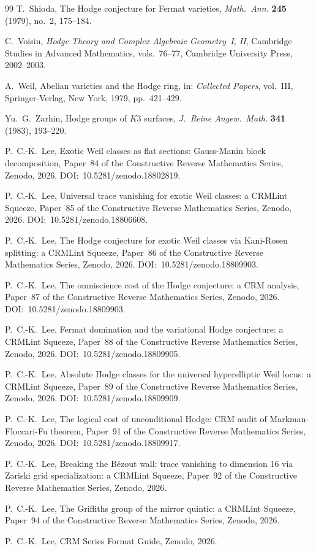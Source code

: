 \documentclass[11pt]{article}
\theoremstyle{plain}
\theoremstyle{definition}
\theoremstyle{remark}
\begin{document}
\begin{thebibliography}{99}
T.~Shioda,
The Hodge conjecture for Fermat varieties,
\emph{Math.\ Ann.} \textbf{245} (1979), no.~2, 175--184.

C.~Voisin,
\emph{Hodge Theory and Complex Algebraic Geometry~I, II},
Cambridge Studies in Advanced Mathematics, vols.~76--77,
Cambridge University Press, 2002--2003.

A.~Weil,
Abelian varieties and the Hodge ring,
in: \emph{Collected Papers}, vol.~III,
Springer-Verlag, New York, 1979, pp.~421--429.

Yu.~G.~Zarhin,
Hodge groups of $K3$ surfaces,
\emph{J.~Reine Angew.\ Math.} \textbf{341} (1983), 193--220.


P.~C.-K.~Lee,
Exotic Weil classes as flat sections: Gauss-Manin block decomposition,
Paper~84 of the Constructive Reverse Mathematics Series,
Zenodo, 2026.
DOI:~10.5281/zenodo.18802819.

P.~C.-K.~Lee,
Universal trace vanishing for exotic Weil classes: a CRMLint Squeeze,
Paper~85 of the Constructive Reverse Mathematics Series,
Zenodo, 2026.
DOI:~10.5281/zenodo.18806608.

P.~C.-K.~Lee,
The Hodge conjecture for exotic Weil classes via Kani-Rosen splitting:
a CRMLint Squeeze, Paper~86 of the Constructive Reverse Mathematics Series,
Zenodo, 2026.
DOI:~10.5281/zenodo.18809903.

P.~C.-K.~Lee,
The omniscience cost of the Hodge conjecture: a CRM analysis,
Paper~87 of the Constructive Reverse Mathematics Series,
Zenodo, 2026.
DOI:~10.5281/zenodo.18809903.

P.~C.-K.~Lee,
Fermat domination and the variational Hodge conjecture: a CRMLint Squeeze,
Paper~88 of the Constructive Reverse Mathematics Series,
Zenodo, 2026.
DOI:~10.5281/zenodo.18809905.

P.~C.-K.~Lee,
Absolute Hodge classes for the universal hyperelliptic Weil locus: a CRMLint Squeeze,
Paper~89 of the Constructive Reverse Mathematics Series,
Zenodo, 2026.
DOI:~10.5281/zenodo.18809909.

P.~C.-K.~Lee,
The logical cost of unconditional Hodge: CRM audit of Markman-Floccari-Fu theorem,
Paper~91 of the Constructive Reverse Mathematics Series,
Zenodo, 2026.
DOI:~10.5281/zenodo.18809917.

P.~C.-K.~Lee,
Breaking the B\'ezout wall: trace vanishing to dimension 16
via Zariski grid specialization: a CRMLint Squeeze, Paper~92 of the Constructive Reverse Mathematics Series,
Zenodo, 2026.

P.~C.-K.~Lee,
The Griffiths group of the mirror quintic: a CRMLint Squeeze,
Paper~94 of the Constructive Reverse Mathematics Series,
Zenodo, 2026.

P.~C.-K.~Lee,
CRM Series Format Guide,
Zenodo, 2026.

\end{thebibliography}
\end{document}
